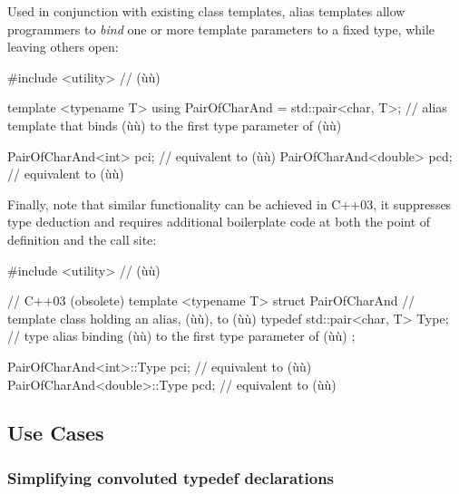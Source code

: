 \noindent Used in conjunction with existing class templates, alias templates allow
programmers to \emph{bind} one or more template parameters to a fixed
type, while leaving others open:

\begin{emcppslisting}
#include <utility>  // (ù{}ù)

template <typename T>
using PairOfCharAnd = std::pair<char, T>;
    // alias template that binds (ù{}ù) to the first type parameter of (ù{}ù)

PairOfCharAnd<int>    pci;  // equivalent to (ù{}ù)
PairOfCharAnd<double> pcd;  // equivalent to (ù{}ù)
\end{emcppslisting}

\noindent Finally, note that similar functionality can be
achieved in C++03, it suppresses type deduction and requires additional boilerplate code at both the
point of definition and the call site:

\begin{emcppshiddenlisting}[emcppsbatch=e1]
#include <utility>  // (ù{}ù)
\end{emcppshiddenlisting}
\begin{emcppslisting}[emcppsbatch=e1]
// C++03 (obsolete)
template <typename T>
struct PairOfCharAnd
    // template class holding an alias, (ù{}ù), to (ù{}ù)
{
    typedef std::pair<char, T> Type;
        // type alias binding (ù{}ù) to the first type parameter of (ù{}ù)
};

PairOfCharAnd<int>::Type    pci;  // equivalent to (ù{}ù)
PairOfCharAnd<double>::Type pcd;  // equivalent to (ù{}ù)
\end{emcppslisting}


\subsection[Use Cases]{Use Cases}\label{use-cases}

\subsubsection[Simplifying convoluted \lstinline!typedef! declarations]{Simplifying convoluted {\SubsubsecCode typedef} declarations}\label{simplifying-convoluted-typedef-declarations}

